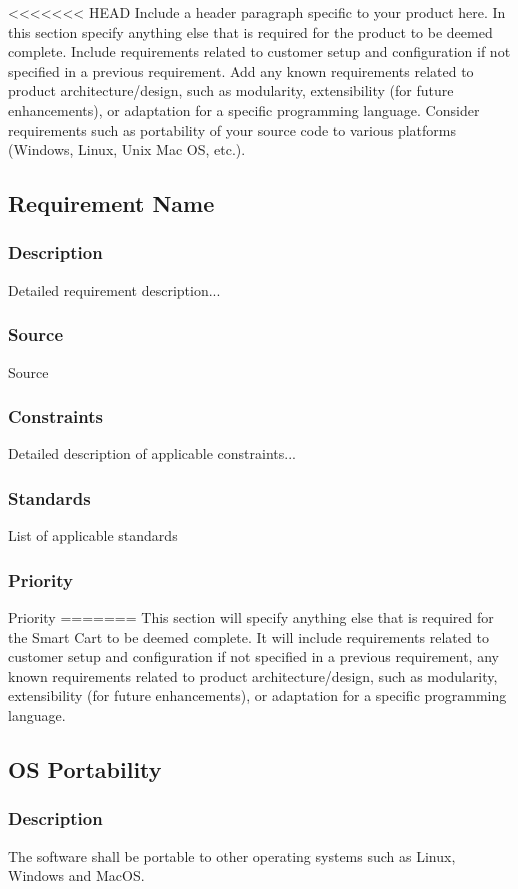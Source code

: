 <<<<<<< HEAD
Include a header paragraph specific to your product here. In this section specify anything else that is required for the product to be deemed complete. Include requirements related to customer setup and configuration if not specified in a previous requirement. Add any known requirements related to product architecture/design, such as modularity, extensibility (for future enhancements), or adaptation for a specific programming language. Consider requirements such as portability of your source code to various platforms (Windows, Linux, Unix Mac OS, etc.).

\subsection{Requirement Name}
\subsubsection{Description}
Detailed requirement description...
\subsubsection{Source}
Source
\subsubsection{Constraints}
Detailed description of applicable constraints...
\subsubsection{Standards}
List of applicable standards
\subsubsection{Priority}
Priority
=======
This section will specify anything else that is required for the Smart Cart to be deemed complete. It will include requirements related to customer setup and configuration if not specified in a previous requirement, any known requirements related to product architecture/design, such as modularity, extensibility (for future enhancements), or adaptation for a specific programming language.

\subsection{OS Portability}
\subsubsection{Description}
The software shall be portable to other operating systems such as Linux, Windows and MacOS. 
